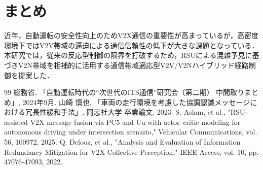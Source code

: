 \documentclass[a4paper,10pt,twocolumn,uplatex]{jsarticle}
\begin{document}
\section{まとめ}
近年，自動運転の安全性向上のためV2X通信の重要性が高まっているが，高密度環境下ではV2V帯域の逼迫による通信信頼性の低下が大きな課題となっている．本研究では，従来の反応型制御の限界を打破するため，RSUによる混雑予見に基づきV2N帯域を相補的に活用する通信帯域適応型V2V/V2Nハイブリッド経路制御を提案した．

\footnotesize{
 \begin{thebibliography}{99}
   総務省, 「自動運転時代の“次世代のITS通信”研究会（第二期） 中間取りまとめ」, 2024年9月.
   山崎 慎也, 「車両の走行環境を考慮した協調認識メッセージにおける冗長性緩和手法」, 同志社大学 卒業論文, 2023.
   S. Aslam, et al., "RSU-assisted V2X message fusion via PC5 and Uu with actor--critic modeling for autonomous driving under intersection scenario," Vehicular Communications, vol. 56, 100972, 2025.
   Q. Delooz, et al., "Analysis and Evaluation of Information Redundancy Mitigation for V2X Collective Perception," IEEE Access, vol. 10, pp. 47076-47093, 2022.
 \end{thebibliography}
}
\end{document}

